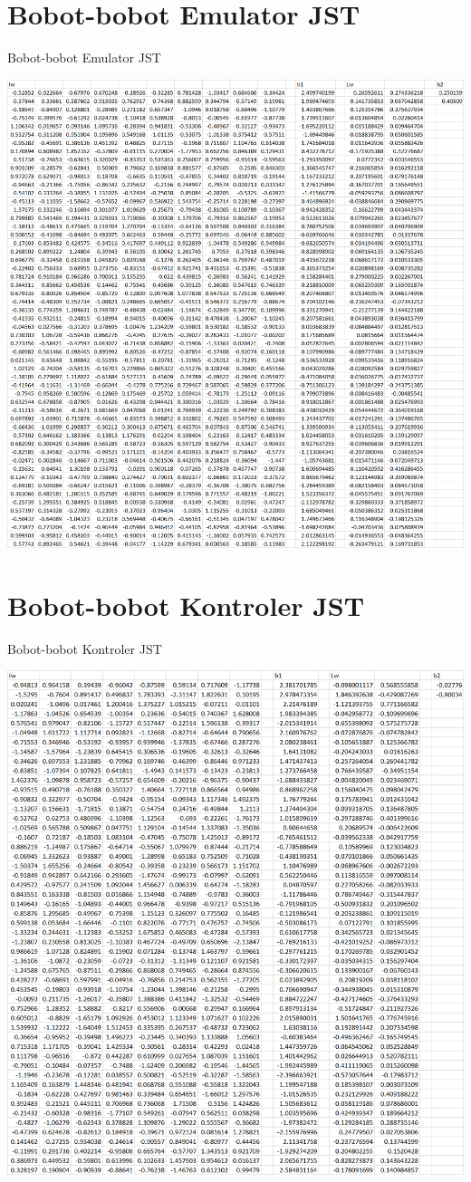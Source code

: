 \section{Bobot-bobot Emulator JST}
\begin{table}[!h]
	\caption{Bobot-bobot Emulator JST}
	\label{tbl:A:BobotEmulator}
	\centering
	\includegraphics[width=1\textwidth]{figures/BobotEmulator}
\end{table}
\vspace{6em}
\hfill\break

\section{Bobot-bobot Kontroler JST}
\begin{table}[!h]
	\caption{Bobot-bobot Kontroler JST}
	\label{tbl:A:BobotKontroler}
	\centering
	\includegraphics[width=1\textwidth]{figures/BobotKontroler}
\end{table}